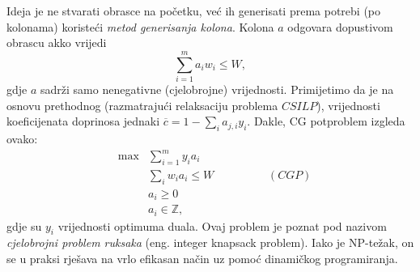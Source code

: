 \documentclass[a4paper, utf8, 11pt, colorlinks]{book}
\begin{document}
 Ideja je ne stvarati obrasce na početku, već ih generisati prema potrebi (po kolonama) koristeći \emph{metod generisanja kolona}. Kolona $a$ odgovara dopustivom obrascu akko vrijedi 
 $$ \sum_{i=1}^m a_i w_i \leq W,$$
 gdje $a$ sadrži samo nenegativne (cjelobrojne) vrijednosti. 
Primijetimo da je na osnovu prethodnog (razmatrajući relaksaciju problema  $CSILP$), vrijednosti koeficijenata doprinosa 
jednaki $\overline{c} = 1 - \sum_{i} a_{j,i} y_i$.  
 Dakle, CG potproblem izgleda ovako:
$$ \begin{array}{lll}
     &\max& \sum_{i=1}^m y_i a_i \\
     &  &\sum_{i} w_i a_i \leq W \hspace{2cm} (CGP)\\
     & &a_i \geq 0 \\
     & &a_i \in \mathbb{Z},
 \end{array}$$
  gdje su $y_i$ vrijednosti optimuma duala. 
 Ovaj problem je poznat pod nazivom \emph{cjelobrojni problem ruksaka} (eng. integer knapsack problem). Iako je NP-težak, on se u praksi rješava na vrlo efikasan način uz pomoć dinamičkog programiranja. 
 
\end{document}
